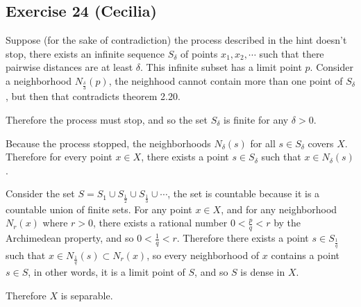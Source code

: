 \subsection*{Exercise 24 (Cecilia)}
Suppose (for the sake of contradiction) the process described in the hint doesn't stop, there exists an infinite sequence $ S_{\delta} $ of points $ x_1, x_2, \cdots $ such that there pairwise distances are at least $ \delta $. This infinite subset has a limit point $ p $. Consider a neighborhood $ N_{\frac{\delta}{3}}(p) $, the neighhood cannot contain more than one point of $ S_{\delta} $, but then that contradicts theorem 2.20.

Therefore the process must stop, and so the set $ S_{\delta} $ is finite for any $ \delta > 0 $.

Because the process stopped, the neighborhoods $ N_{\delta}(s) $ for all $ s \in S_{\delta} $ covers $ X $. Therefore for every point $ x \in X $, there exists a point $ s \in S_{\delta} $ such that $ x \in N_{\delta}(s) $.

Consider the set $ S = S_1 \cup S_{\frac{1}{2}} \cup S_{\frac{1}{3}} \cup \cdots $, the set is countable because it is a countable union of finite sets. For any point $ x \in X $, and for any neighborhood $ N_r(x) $ where $ r > 0 $, there exists a rational number $ 0 < \frac{p}{q} < r $ by the Archimedean property, and so $ 0 < \frac{1}{q} < r $. Therefore there exists a point $ s \in S_{\frac{1}{q}} $ such that $ x \in N_{\frac{1}{q}}(s) \subset N_r(x) $, so every neighborhood of $ x $ contains a point $ s \in S $, in other words, it is a limit point of $ S $, and so $ S $ is dense in $ X $.

Therefore $ X $ is separable.